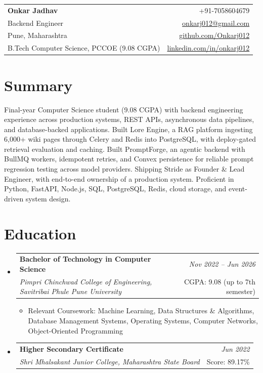 \documentclass[a4paper,11pt]{article}
\makeatletter
\newcommand{\resumeSubheading}[4]{
\vspace{0.5mm}\item
    \begin{tabular*}{0.98\textwidth}[t]{l@{\extracolsep{\fill}}r}
        \textbf{#1} & \textit{\footnotesize{#4}} \\
        \textit{\footnotesize{#3}} & \footnotesize{#2}\\
    \end{tabular*}
    \vspace{-2.4mm}
}
\newcommand{\resumeSubHeadingListStart}{\begin{itemize}[leftmargin=*,labelsep=0mm]}
\newcommand{\resumeItemListStart}{\begin{justify}\begin{itemize}[leftmargin=3ex, rightmargin=2ex, noitemsep,labelsep=1.2mm,itemsep=0mm]\small}
\newcommand{\resumeSubHeadingListEnd}{\end{itemize}\vspace{2mm}}
\newcommand{\resumeItemListEnd}{\end{itemize}\end{justify}\vspace{-2mm}}
\newcommand{\name}{Onkar Jadhav}
\newcommand{\phone}{7058604679}
\newcommand{\emaila}{onkarj012@gmail.com}
\newcommand{\github}{github.com/Onkarj012}
\newcommand{\linkedin}{linkedin.com/in/onkarj012}
\makeatother
\begin{document}
\selectfont

\begin{tabularx}{\linewidth}{L r}
  \textbf{\Large \name} & {+91-\phone}\\
  {Backend Engineer} & \href{mailto:\emaila}{\emaila} \\
  {Pune, Maharashtra} & \href{https://\github}{\github} \\
  {B.Tech Computer Science, PCCOE (9.08 CGPA)} & \href{https://\linkedin}{\linkedin}
\end{tabularx}
\vspace{-4mm}

\section{\textbf{Summary}}
\vspace{1mm}
\small{
Final-year Computer Science student (9.08 CGPA) with backend engineering experience across production systems, REST APIs, asynchronous data pipelines, and database-backed applications. Built Lore Engine, a RAG platform ingesting 6,000+ wiki pages through Celery and Redis into PostgreSQL, with deploy-gated retrieval evaluation and caching. Built PromptForge, an agentic backend with BullMQ workers, idempotent retries, and Convex persistence for reliable prompt regression testing across model providers. Shipping Stride as Founder \& Lead Engineer, with end-to-end ownership of a production system. Proficient in Python, FastAPI, Node.js, SQL, PostgreSQL, Redis, cloud storage, and event-driven system design.
}
\vspace{-3mm}

\section{\textbf{Education}}
  \resumeSubHeadingListStart
    \resumeSubheading
      {Bachelor of Technology in Computer Science}{CGPA: 9.08 (up to 7th semester)}
      {Pimpri Chinchwad College of Engineering, Savitribai Phule Pune University}{Nov 2022 -- Jun 2026}
      \resumeItemListStart
        \item {Relevant Coursework: Machine Learning, Data Structures \& Algorithms, Database Management Systems, Operating Systems, Computer Networks, Object-Oriented Programming}
      \resumeItemListEnd
    \resumeSubheading
      {Higher Secondary Certificate}{Score: 89.17\%}
      {Shri Mhalsakant Junior College, Maharashtra State Board}{Jun 2022}
  \resumeSubHeadingListEnd
\vspace{-5.5mm}
\end{document}
